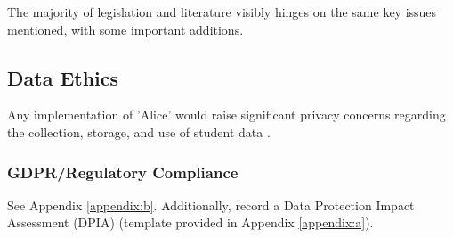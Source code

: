 \documentclass[14pt,a4paper]{article}
\begin{document}
\begin{multicols}{2}
The majority of legislation and literature visibly hinges on the same key issues mentioned, with some important additions.


\subsection{Data Ethics}
Any implementation of 'Alice' would raise significant privacy concerns regarding the collection, storage, and use of student data \textit{\parencite[pp. 366-370]{Annus2023}}.

\subsubsection{GDPR/Regulatory Compliance}
See Appendix \ref{appendix:b}. Additionally, record a Data Protection Impact Assessment (DPIA) (template provided in Appendix \ref{appendix:a}).





\end{multicols}
\end{document}
